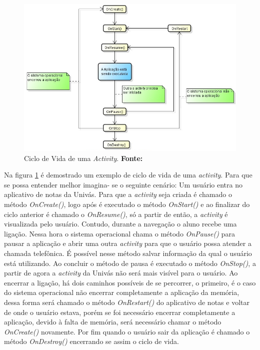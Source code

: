 \begin{figure}[h!]
	\centerline{\includegraphics[scale=0.5]{./imagens/imagem3.png}}
	\caption[Ciclo de Vida de uma \textit{Activity} ]{Ciclo de Vida de uma
	\textit{Activity}.
	 \textbf{Fonte:}}
	\label{fig:exemplo1}
\end{figure}

	\par Na figura \ref{fig:exemplo1} é demostrado um exemplo de ciclo de
vida de uma \textit{activity}. Para que se possa entender melhor imagina- se o
seguinte cenário: Um usuário entra no aplicativo de notas da Univás. Para que a
\textit{activity} seja criada é chamado o método \textit{OnCreate()}, logo após
é executado o método \textit{OnStart()} e ao finalizar do ciclo anterior é
chamado o \textit{OnResume()}, só a partir de então, a \textit{activity} é
visualizada pelo usuário. Contudo, durante a navegação o aluno recebe uma
ligação. Nessa hora o sistema operacional chama o método \textit{OnPause()}
para pausar a aplicação e abrir uma outra \textit{activity} para que o usuário
possa atender a chamada telefônica. É possível nesse método salvar informação
da qual o usuário está utilizando. Ao concluir o método de pausa é executado o
método \textit{OnStop()}, a partir de agora a \textit{activity} da Univás não
será mais visível para o usuário. Ao encerrar a ligação, há dois caminhos
possíveis de se percorrer, o primeiro, é o caso do sistema operacional não
encerrar completamente a aplicação da memória, dessa forma será chamado o
método \textit{OnRestart()} do aplicativo de notas e voltar de onde o usuário
estava, porém se foi necessário encerrar completamente a aplicação, devido à
falta de memória, será necessário chamar o método \textit{OnCreate()}
novamente. Por fim quando o usuário sair da aplicação é chamado o método
\textit{OnDestroy()} encerrando se assim o ciclo de vida.

